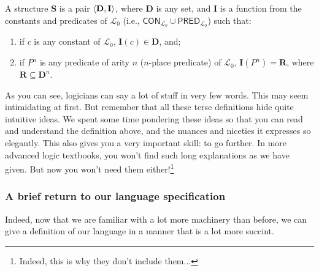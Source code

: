 \begin{defn} \label{structure}
A structure $\mathbf{S}$ is a pair $\langle\mathbf{D}, \mathbf{I}\rangle$, where $\mathbf{D}$ is any set, and $\mathbf{I}$ is a function from the constants and predicates of $\mathcal{L}_0$ (i.e., $\mathsf{CON}_{\mathcal{L}_0} \cup \mathsf{PRED}_{\mathcal{L}_0}$) such that:
%
\begin{enumerate}
	\item if $c$ is any constant of $\mathcal{L}_0$, $\mathbf{I}(c) \in \mathbf{D}$, and;
	\item if $P^n$ is any predicate  of arity $n$ ($n$-place predicate) of $\mathcal{L}_0$, $\mathbf{I}(P^n)=\mathbf{R}$, where $\mathbf{R} \subseteq \mathbf{D}^n$. 
\end{enumerate}
\end{defn}

As you can see, logicians can say a lot of stuff in very few words. This may seem intimidating at first. But remember that all these terse definitions hide quite intuitive ideas. We spent some time pondering these ideas so that you can read and understand the definition above, and the nuances and niceties it expresses so elegantly. This also gives you a very important skill: to go further. In more advanced logic textbooks, you won't find such long explanations as we have given. But now you won't need them either!\footnote{Indeed, this is why they don't include them...}

\subsubsection{A brief return to our language specification}

Indeed, now that we are familiar with a lot more machinery than before, we can give a definition of our language in a manner that is a lot more succint. 


